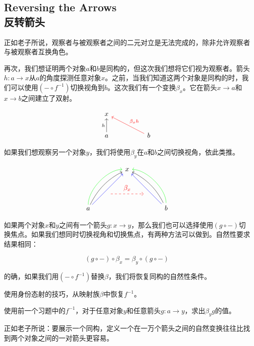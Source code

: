 \documentclass[DaoFP]{subfiles}
\begin{document}
 \subsection{Reversing the Arrows\\反转箭头}

 正如老子所说，观察者与被观察者之间的二元对立是无法完成的，除非允许观察者与被观察者互换角色。

 再次，我们想证明两个对象$a$和$b$是同构的，但这次我们想将它们视为观察者。箭头$h \colon a \to x$从$a$的角度探测任意对象$x$。之前，当我们知道这两个对象是同构的时，我们可以使用$(- \circ f^{-1})$切换视角到$b$。这次我们有一个变换$\beta_x$。它在箭头$x \to a$和$x \to b$之间建立了双射。

 \[
  \begin{tikzcd}
   x
   \\
   a
   \arrow[u, "h"]
   && b
   \arrow[llu, red, "\beta_x h"']
  \end{tikzcd}
 \]

 如果我们想观察另一个对象$y$，我们将使用$\beta_y$在$a$和$b$之间切换视角，依此类推。

 \[
  \begin{tikzcd}
   \node(x) at (0, 2) {x};
   \node(a) at (-2, 0) {a};
   \node(b) at (2, 0) {b};
   \node(c1) at (-1, 1.5) {};
   \node(c2) at (-1.5, 1) {};
   \node(c3) at (-1, 2) {};
   \node(c4) at (-2, 1) {};
   \node(d1) at (1, 1.5) {};
   \node(d2) at (1.5, 1) {};
   \node(d3) at (1, 2) {};
   \node(d4) at (2, 1) {};
   \node (aa) at (-1, 0.75) {};
   \node (bb) at (1, 0.75) {};
   \draw[<-] (x) .. controls (c1)  and (c2) .. (a); %
   \draw[<-, green] (x) .. controls (c3)  and (c4) .. (a); %
   \draw[<-, blue] (x) -- (a);
   \draw[<-] (x) .. controls (d1)  and (d2) .. (b); %
   \draw[<-, green] (x) .. controls (d3)  and (d4) .. (b); %
   \draw[<-, blue] (x) -- (b);
   \draw[->, red, dashed] (aa) -- node[above]{\beta_x} (bb);
  \end{tikzcd}
 \]

 如果两个对象$x$和$y$之间有一个箭头$g \colon x \to y$，那么我们也可以选择使用$(g \circ -)$切换焦点。如果我们想同时切换视角和切换焦点，有两种方法可以做到。自然性要求结果相同：

 \[ (g \circ -) \circ \beta_x = \beta_y \circ (g \circ -) \]

 的确，如果我们用$(- \circ f^{-1})$替换$\beta$，我们将恢复同构的自然性条件。

 \begin{exercise}
  使用身份态射的技巧，从映射族$\beta$中恢复$f^{-1}$。
 \end{exercise}

 \begin{exercise}
  使用前一个习题中的$f^{-1}$，对于任意对象$y$和任意箭头$g \colon a \to y$，求出$\beta_y g$的值。
 \end{exercise}

 正如老子所说：要展示一个同构，定义一个在一万个箭头之间的自然变换往往比找到两个对象之间的一对箭头更容易。
\end{document}
